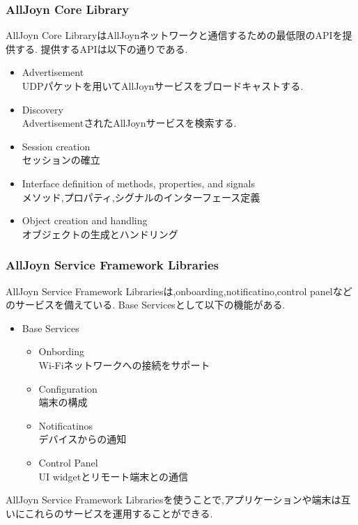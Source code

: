 \subsubsection{AllJoyn Core Library}
AllJoyn Core LibraryはAllJoynネットワークと通信するための最低限のAPIを提供する.
提供するAPIは以下の通りである.

\begin{itemize}
\item Advertisement \\
UDPパケットを用いてAllJoynサービスをブロードキャストする.
\item Discovery \\
AdvertisementされたAllJoynサービスを検索する.
\item Session creation \\
セッションの確立
\item Interface definition of methods, properties, and signals \\
メソッド,プロパティ,シグナルのインターフェース定義
\item Object creation and handling \\
オブジェクトの生成とハンドリング
\end{itemize}

\subsubsection{AllJoyn Service Framework Libraries}
AllJoyn Service Framework Librariesは,onboarding,notificatino,control panelなどのサービスを備えている.
Base Servicesとして以下の機能がある.

\begin{itemize}
\item Base Services
\begin{itemize}
\item Onbording \\
Wi-Fiネットワークへの接続をサポート
\item Configuration \\
端末の構成
\item Notificatinos \\
デバイスからの通知
\item Control Panel \\
UI widgetとリモート端末との通信
\end{itemize}
\end{itemize}

AllJoyn Service Framework Librariesを使うことで,アプリケーションや端末は互いにこれらのサービスを運用することができる.


